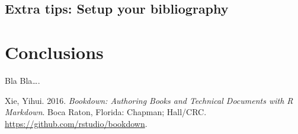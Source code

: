 \documentclass[12pt,]{article}
\begin{document}
\subsection{Extra tips: Setup your
bibliography}\label{extra-tips-setup-your-bibliography}

\section{Conclusions}\label{conclusions}

Bla Bla\ldots{}.

\newpage

\hypertarget{refs}{}
\hypertarget{ref-bookdown}{}
Xie, Yihui. 2016. \emph{Bookdown: Authoring Books and Technical
Documents with R Markdown}. Boca Raton, Florida: Chapman; Hall/CRC.
\url{https://github.com/rstudio/bookdown}.
\end{document}
